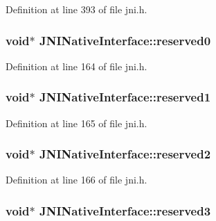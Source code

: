 Definition at line 393 of file jni.\-h.

\hypertarget{struct_j_n_i_native_interface_a66886069dfdc1bf70964ffa0c9f152e7}{
\subsubsection[{reserved0}]{\setlength{\rightskip}{0pt plus 5cm}void$\ast$ J\-N\-I\-Native\-Interface\-::reserved0}}\label{struct_j_n_i_native_interface_a66886069dfdc1bf70964ffa0c9f152e7}


Definition at line 164 of file jni.\-h.

\hypertarget{struct_j_n_i_native_interface_a855556a27b32d2c64350a7c8ffe75ebf}{
\subsubsection[{reserved1}]{\setlength{\rightskip}{0pt plus 5cm}void$\ast$ J\-N\-I\-Native\-Interface\-::reserved1}}\label{struct_j_n_i_native_interface_a855556a27b32d2c64350a7c8ffe75ebf}


Definition at line 165 of file jni.\-h.

\hypertarget{struct_j_n_i_native_interface_a7af2582938faf043411e76f8aca6d250}{
\subsubsection[{reserved2}]{\setlength{\rightskip}{0pt plus 5cm}void$\ast$ J\-N\-I\-Native\-Interface\-::reserved2}}\label{struct_j_n_i_native_interface_a7af2582938faf043411e76f8aca6d250}


Definition at line 166 of file jni.\-h.

\hypertarget{struct_j_n_i_native_interface_ae96ae8dd121221995a5071764606d9a1}{
\subsubsection[{reserved3}]{\setlength{\rightskip}{0pt plus 5cm}void$\ast$ J\-N\-I\-Native\-Interface\-::reserved3}}\label{struct_j_n_i_native_interface_ae96ae8dd121221995a5071764606d9a1}


